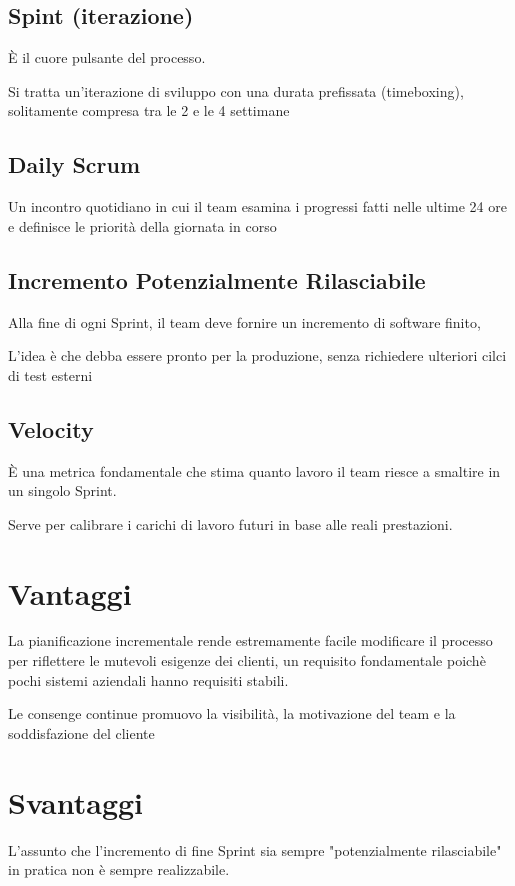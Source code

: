 \subsection{Spint (iterazione)}
È il cuore pulsante del processo.

Si tratta un'iterazione di sviluppo con una durata prefissata (timeboxing), solitamente compresa tra le 2 e le 4 settimane

\subsection{Daily Scrum}
Un incontro quotidiano in cui il team esamina i progressi fatti nelle ultime 24 ore e definisce le priorità della giornata in corso

\subsection{Incremento Potenzialmente Rilasciabile}
Alla fine di ogni Sprint, il team deve fornire un incremento di software finito,

L'idea è che debba essere pronto per la produzione, senza richiedere ulteriori cilci di test esterni

\subsection{Velocity}
È una metrica fondamentale che stima quanto lavoro il team riesce a smaltire in un singolo Sprint.

Serve per calibrare i carichi di lavoro futuri in base alle reali prestazioni.

\section{Vantaggi}
La pianificazione incrementale rende estremamente facile modificare il processo per riflettere le mutevoli esigenze dei clienti, un requisito fondamentale poichè pochi sistemi aziendali hanno requisiti stabili.

Le consenge continue promuovo la visibilità, la motivazione del team e la soddisfazione del cliente

\section{Svantaggi}
L'assunto che l'incremento di fine Sprint sia sempre "potenzialmente rilasciabile" in pratica non è sempre realizzabile.

